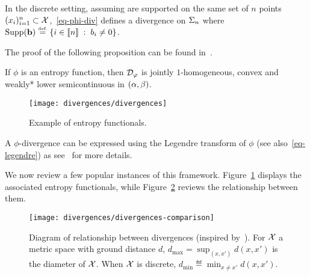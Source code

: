 In the discrete setting, assuming 
are supported on the same set of $n$ points $(x_i)_{i=1}^n \subset \mathcal{X}$,~\eqref{eq-phi-div} defines a divergence on $\Sigma_n$
where $\Supp(\b) \eqdef \enscond{i \in \range{n}}{ b_i \neq 0 }$.

The proof of the following proposition can be found in~\cite[Thm 2.7]{LieroMielkeSavareLong}.

\begin{proposition}
If $\phi$ is an entropy function, then $\mathcal{D}_\varphi$ is jointly $1$-homogeneous, convex and weakly* lower semicontinuous in $(\alpha,\beta)$.
\end{proposition}


\begin{figure}[h!]
\centering
\texttt{[image: divergences/divergences]}
\caption{\label{fig-divergences}
Example of entropy functionals.
}
\end{figure}


\begin{rem}
	A $\phi$-divergence can be expressed using the Legendre transform 
	of $\phi$ (see also~\eqref{eq-legendre}) as
	see~\citet{LieroMielkeSavareLong} for more details.
\end{rem}


We now review a few popular instances of this framework. Figure~\ref{fig-divergences} displays the associated entropy functionals, while Figure~\ref{fig-divergences-relations} reviews the relationship between them.





\begin{figure}[h!]
\centering
\texttt{[image: divergences/divergences-comparison]}
\caption{\label{fig-divergences-relations}
Diagram of relationship between divergences (inspired by~\citet{gibbs2002choosing}).
For $\mathcal{X}$ a metric space with ground distance $d$, $d_{\max} = \sup_{(x,x')} d(x,x')$ is the diameter of $\mathcal{X}$. When $\mathcal{X}$ is discrete, $d_{\min} \eqdef \min_{x \neq x'} d(x,x')$. 
}
\end{figure}


